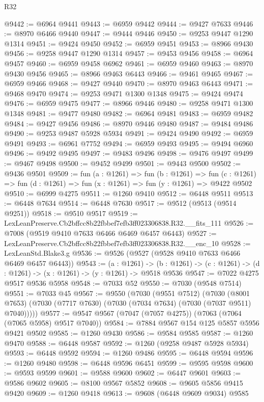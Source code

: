 \begin{lexlean}{R32}
\begin{coremodule}
@9442 := @6964 @9441
@9443 := @6959 @9442
@9444 := @9427 @7633
@9446 := @8970 @6466 @9440
@9447 := @9444 @9446
@9450 := @9253 @9447 @1290 @1314
@9451 := @9424 @9450
@9452 := @6959 @9451
@9453 := @8966 @9430
@9456 := @9258 @9447 @1290 @1314
@9457 := @9453 @9456
@9458 := @6964 @9457
@9460 := @6959 @9458 @6962
@9461 := @6959 @9460
@9463 := @8970 @9430 @9456
@9465 := @8966 @9463 @6443
@9466 := @9461 @9465
@9467 := @6959 @9466
@9468 := @9427 @9440
@9470 := @8970 @9463 @6443
@9471 := @9468 @9470
@9474 := @9253 @9471 @1300 @1348
@9475 := @9424 @9474
@9476 := @6959 @9475
@9477 := @8966 @9446
@9480 := @9258 @9471 @1300 @1348
@9481 := @9477 @9480
@9482 := @6964 @9481
@9483 := @6959 @9482
@9484 := @9427 @9456
@9486 := @8970 @9446 @9480
@9487 := @9484 @9486
@9490 := @9253 @9487 @5928 @5934
@9491 := @9424 @9490
@9492 := @6959 @9491
@9493 := @6961 @7752
@9494 := @6959 @9493
@9495 := @9494 @6960
@9496 := @9492 @9495
@9497 := @9483 @9496
@9498 := @9476 @9497
@9499 := @9467 @9498
@9500 := @9452 @9499
@9501 := @9443 @9500
@9502 := @9436 @9501
@9509 := fun (a : @1261) =>
  fun (b : @1261) =>
  fun (c : @1261) => fun (d : @1261) => fun (x : @1261) => fun (y : @1261) => @9422 @9502
@9510 := @6999 @4275
@9511 := @1260 @9410
@9512 := @6448 @9511
@9513 := @6448 @7634
@9514 := @6448 @7630
@9517 := @9512 (@9513 (@9514 @9251))
@9518 := @9510 @9517
@9519 := LexLeanPreserve.Cb2bffcc8b22fbbef7efb3ff023306838.R32.__fits_111
@9526 := @7008 (@9519 @9410 @7633 @6466 @6469 @6457 @6443)
@9527 := LexLeanPreserve.Cb2bffcc8b22fbbef7efb3ff023306838.R32.__enc_10
@9528 := LexLeanStd.Blake3.g
@9536 := @9526 (@9527 (@9528 @9410 @7633 @6466 @6469 @6457 @6443))
@9543 := (a : @1261) ->
  (b : @1261) -> (c : @1261) -> (d : @1261) -> (x : @1261) -> (y : @1261) -> @9518 @9536
@9547 := @7022 @4275 @9517 @9536 @5958
@9548 := @7033 @52
@9550 := @7030 (@9548 @7514)
@9551 := @7033 @45
@9567 := @9550
    (@7030
      (@9551 @7512)
      (@7030 (@8001 @7653) (@7030 (@7717 @7630) (@7030 (@7034 @7634) (@7030 (@7037 @9511) @7040)))))
@9577 := @9547 @9567 (@7047 (@7057 @4275)) (@7063 (@7064 (@7065 @5958) @9517 @7040))
@9584 := @7884 @9567 @154 @125 @5857 @5956 @9421 @9502
@9585 := @1260 @9430
@9586 := @9584 @9585
@9587 := @1260 @9470
@9588 := @6448 @9587
@9592 := @1260 (@9258 @9487 @5928 @5934)
@9593 := @6448 @9592
@9594 := @1260 @9486
@9595 := @6448 @9594
@9596 := @1260 @9480
@9598 := @6448 @9596 @6451
@9599 := @9595 @9598
@9600 := @9593 @9599
@9601 := @9588 @9600
@9602 := @6447 @9601
@9603 := @9586 @9602
@9605 := @8100 @9567 @5852
@9608 := @9605 @5856 @9415 @9420
@9609 := @1260 @9418
@9613 := @9608 (@6448 @9609 @9034) @9585

\end{coremodule}
\end{lexlean}
